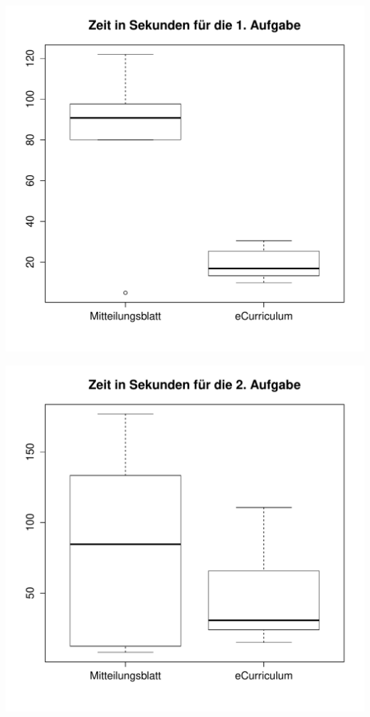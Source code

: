 \documentclass[a4paper,10pt]{scrartcl}
\begin{document}
\begin{center}
 \includegraphics[width=\linewidth]{./Appendix/Plots/Boxplots/a1_boxplot.pdf}
\end{center}

\begin{center}
 \includegraphics[width=\linewidth]{./Appendix/Plots/Boxplots/a2_boxplot.pdf}
\end{center}
\end{document}
